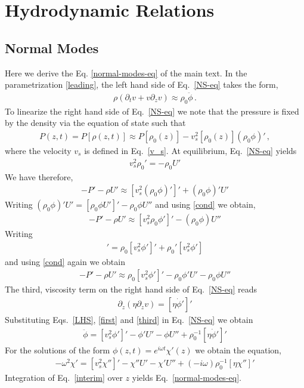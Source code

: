 \chapter{Hydrodynamic Relations}
\section{Normal Modes}
\label{App2}
\setcounter{equation}{0}

Here we derive the Eq. \eqref{normal-modes-eq} of the main text. In the parametrization \eqref{leading}, the left hand side of Eq.~\eqref{NS-eq} takes the form, 
\begin{align}\label{LHS}
\rho(\partial_t v+v\partial_zv) \approx \rho_0 \ddot{\phi}\, .
\end{align}
To linearize the right hand side of Eq.~\eqref{NS-eq} we note that the pressure is fixed by the density via the equation of state such that 
\begin{align}
P(z,t) = P[\rho(z,t)] \approx P[\rho_0(z)] - v_s^2[\rho_0(z)] (\rho_0 \phi)'\, ,
\end{align}
where the velocity $v_s$ is defined in Eq.~\eqref{v_s}.
At equilibrium, Eq.~\eqref{NS-eq} yields 
\begin{align}\label{cond}
v_s^2 \rho_0' = -\rho_0 U'
\end{align}
We have therefore,
\begin{align}
-P'-\rho U' \approx 
[ v_s^2 (\rho_0 \phi)']' +
(\rho_0 \phi)' U'
 \end{align}
Writing $(\rho_0 \phi)' U' =[ \rho_0 \phi U']' - \rho_0 \phi U''$ and using \eqref{cond} we obtain,
\begin{align}
-P'-\rho U' \approx 
[ v_s^2 \rho_0 \phi ']' 
- (\rho_0 \phi) U''
 \end{align}
Writing 
\begin{align*}
[ v_s^2 \rho_0 \phi ']'  =\rho_0 [ v_s^2 \phi ']' +  \rho_0' [ v_s^2 \phi ']
\end{align*}
and using \eqref{cond} again we obtain
\begin{align}\label{first}
-P'-\rho U' \approx 
\rho_0 [ v_s^2 \phi ']' -  
\rho_0 \phi ' U'
- \rho_0 \phi U''
 \end{align}
The third, viscosity term on the right hand side of Eq.~\eqref{NS-eq} reads
\begin{align}\label{third}
\partial_z(\eta\partial_z v) = [\eta \dot{\phi}']'
\end{align}
Substituting Eqs.~\eqref{LHS}, \eqref{first} and \eqref{third} in Eq.~\eqref{NS-eq} we obtain
\begin{align}
\ddot{\phi} = 
[ v_s^2 \phi ']' -  
 \phi ' U'
- \phi U'' + \rho_0^{-1} [\eta \dot{\phi}']'
\end{align}
For the solutions of the form $\phi(z,t) = e^{i \omega t} \chi'(z)$ we obtain the equation,
\begin{align}\label{interim}
 - \omega^2 \chi' = 
[ v_s^2 \chi'']' -  
\chi'' U'
- \chi' U'' +  (- i \omega)\rho_0^{-1} [\eta \chi'']'
\end{align}
Integration of Eq.~\eqref{interim} over $z$ yields Eq.~\eqref{normal-modes-eq}.

